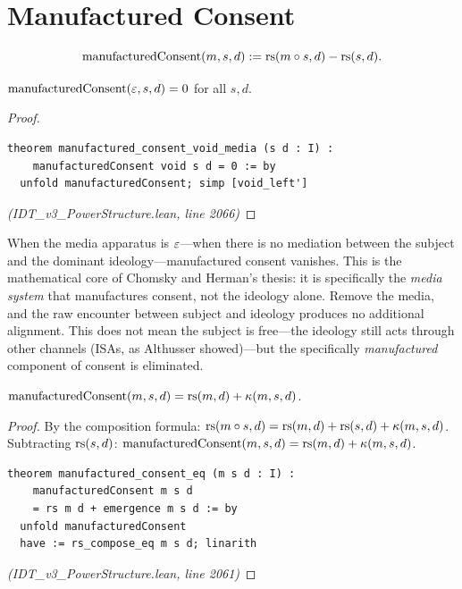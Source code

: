 \section{Manufactured Consent}

\begin{definition}
\label{def:manufactured-consent}
\[
  \mathrm{manufacturedConsent}(m, s, d) := \mathrm{rs}(m \circ s, d) - \mathrm{rs}(s, d).
\]
\end{definition}

\begin{theorem}
\label{thm:consent-void}
$\mathrm{manufacturedConsent}(\varepsilon, s, d) = 0$ for all $s, d$.
\end{theorem}

\begin{proof}
\begin{lstlisting}
theorem manufactured_consent_void_media (s d : I) :
    manufacturedConsent void s d = 0 := by
  unfold manufacturedConsent; simp [void_left']
\end{lstlisting}
\textit{(IDT\_v3\_PowerStructure.lean, line 2066)}
\end{proof}

\begin{interpretation}
When the media apparatus is $\varepsilon$---when there is no mediation between the
subject and the dominant ideology---manufactured consent vanishes. This is the
mathematical core of Chomsky and Herman's thesis: it is specifically the
\emph{media system} that manufactures consent, not the ideology alone. Remove
the media, and the raw encounter between subject and ideology produces no
additional alignment. This does not mean the subject is free---the ideology
still acts through other channels (ISAs, as Althusser showed)---but the
specifically \emph{manufactured} component of consent is eliminated.
\end{interpretation}

\begin{theorem}
\label{thm:manufactured-consent-decomp}
$\mathrm{manufacturedConsent}(m, s, d) = \mathrm{rs}(m, d) + \kappa(m, s, d)$.
\end{theorem}

\begin{proof}
By the composition formula:
$\mathrm{rs}(m \circ s, d) = \mathrm{rs}(m, d) + \mathrm{rs}(s, d) + \kappa(m, s, d)$.
Subtracting $\mathrm{rs}(s, d)$:
$\mathrm{manufacturedConsent}(m, s, d) = \mathrm{rs}(m, d) + \kappa(m, s, d)$.
\begin{lstlisting}
theorem manufactured_consent_eq (m s d : I) :
    manufacturedConsent m s d
    = rs m d + emergence m s d := by
  unfold manufacturedConsent
  have := rs_compose_eq m s d; linarith
\end{lstlisting}
\textit{(IDT\_v3\_PowerStructure.lean, line 2061)}
\end{proof}

